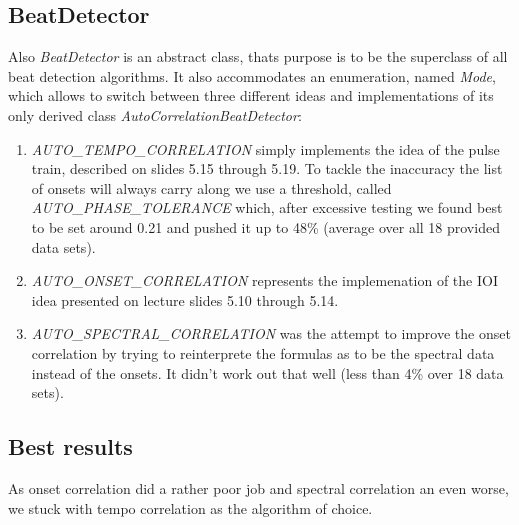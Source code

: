 \subsection{\ttfamily BeatDetector}
Also \emph{BeatDetector} is an abstract class, thats purpose is to be the
superclass of all beat detection algorithms. It also accommodates an
enumeration, named \emph{Mode}, which allows to switch between three different
ideas and implementations of its only derived class
\emph{AutoCorrelationBeatDetector}:

\begin{enumerate}
  \item \emph{AUTO\_TEMPO\_CORRELATION} simply implements the idea of the pulse
  train, described on slides 5.15 through 5.19. To tackle the inaccuracy the
  list of onsets will always carry along we use a threshold, called
  \emph{AUTO\_PHASE\_TOLERANCE} which, after excessive testing we found best to
  be set around 0.21 and pushed it up to 48\% (average over all 18 provided data
  sets).
  \item \emph{AUTO\_ONSET\_CORRELATION} represents the implemenation of the IOI
  idea presented on lecture slides 5.10 through 5.14.
  \item \emph{AUTO\_SPECTRAL\_CORRELATION} was the attempt to improve the onset
  correlation by trying to reinterprete the formulas as to be the spectral data
  instead of the onsets. It didn't work out that well (less than 4\% over 18
  data sets).
\end{enumerate}


\subsection{Best results}
As onset correlation did a rather poor job and spectral correlation an even
worse, we stuck with tempo correlation as the algorithm of choice.
